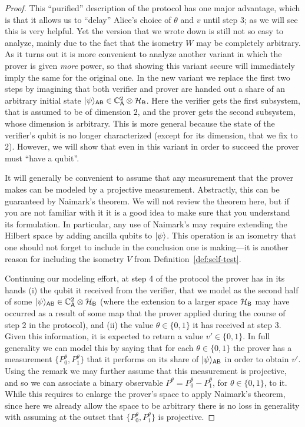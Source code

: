 \begin{proof}
This ``purified'' description of the protocol has one major advantage, which is that it allows us to ``delay'' Alice's choice of $\theta$ and $v$ until step 3; as we will see this is very helpful. Yet the version that we wrote down is still not so easy to analyze, mainly due to the fact that the isometry $W$ may be completely arbitrary. As it turns out it is more convenient to analyze another variant in which the prover is given \emph{more} power, so that showing this variant secure will immediately imply the same for the original one. In the new variant we replace the first two steps by imagining that both verifier and prover are handed out a share of an arbitrary initial state $|\psi\rangle_{{\textsf{AB}}} \in \mathbb{C}^2_{{\textsf{A}}} \otimes \mathcal{H}_{{\textsf{B}}}$. Here the verifier gets the first subsystem, that is assumed to be of dimension $2$, and the prover gets the second subsystem, whose dimension is arbitrary. This is more general because the state of the verifier's qubit is no longer characterized (except for its dimension, that we fix to $2$). However, we will show that even in this variant in order to succeed the prover must ``have a qubit''. 

\begin{remark} It will generally be convenient to assume that any measurement that the prover makes can be modeled by a projective measurement. Abstractly, this can be guaranteed by Naimark's theorem. We will not review the theorem here, but if you are not familiar with it it is a good idea to make sure that you understand its formulation. In particular, any use of Naimark's may require extending the Hilbert space by adding ancilla qubits to $|\psi\rangle$. This operation is an isometry that one should not forget to include in the conclusion one is making---it is another reason for including the isometry $V$ from Definition~\ref{def:self-test}.
\end{remark}

Continuing our modeling effort, at step 4 of the protocol the prover has in its hands (i) the qubit it received from the verifier, that we model as the second half of some $|\psi\rangle_{{\textsf{AB}}} \in \mathbb{C}^2_{{\textsf{A}}} \otimes \mathcal{H}_{{\textsf{B}}}$ (where the extension to a larger space $\mathcal{H}_{{\textsf{B}}}$ may have occurred as a result of some map that the prover applied  during the course of step 2 in the protocol), and (ii) the value $\theta\in\{0,1\}$ it has received at step 3. Given this information, it is expected to return a value $v'\in\{0,1\}$. In full generality we can model this by saying that for each $\theta\in\{0,1\}$ the prover has a measurement $\{P^\theta_0,P^\theta_1\}$ that it performs on its share of $|\psi\rangle_{{\textsf{AB}}}$ in order to obtain $v'$. Using the remark we may further assume that this measurement is projective, and so we can associate a binary observable $P^\theta = P^\theta_0 - P^\theta_1$, for $\theta\in\{0,1\}$, to it. While this requires to enlarge the prover's space to apply Naimark's theorem, since here we already allow the space to be arbitrary there is no loss in generality with assuming at the outset that $\{P^\theta_0,P^\theta_1\}$ is projective. 


\end{proof}

